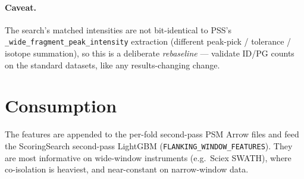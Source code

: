\documentclass[11pt]{article}
\newcommand{\code}[1]{\texttt{#1}}
\begin{document}
\paragraph{Caveat.} The search's matched intensities are not bit-identical to PSS's
\code{\_wide\_fragment\_peak\_intensity} extraction (different peak-pick / tolerance / isotope
summation), so this is a deliberate \emph{rebaseline} --- validate ID/PG counts on the standard
datasets, like any results-changing change.

\section{Consumption}
The features are appended to the per-fold second-pass PSM Arrow files and feed the ScoringSearch
second-pass LightGBM (\code{FLANKING\_WINDOW\_FEATURES}). They are most informative on
wide-window instruments (e.g.\ Sciex SWATH), where co-isolation is heaviest, and near-constant
on narrow-window data.
\end{document}

